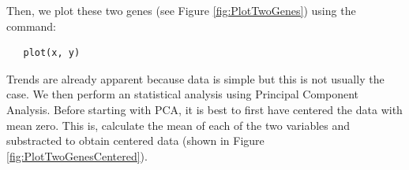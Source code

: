 \documentclass[11pt, oneside]{article}   	%
\begin{document}
Then, we plot these two genes (see Figure \ref{fig:PlotTwoGenes}) using the command: 

\begin{framed}
\begin{verbatim}
   plot(x, y)
\end{verbatim}
\end{framed}


\noindent Trends are already apparent because data is simple but this is not usually the case. We then perform an statistical analysis using Principal Component Analysis. Before starting with PCA, it is best to first have centered the data with mean zero. This is, calculate the mean of each of the two variables and substracted to obtain centered data (shown in Figure \ref{fig:PlotTwoGenesCentered}). 


\end{document}
